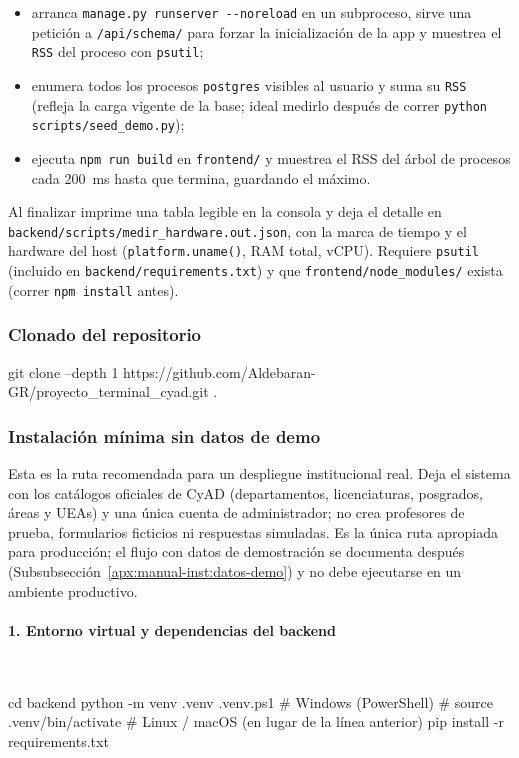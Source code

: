 \begin{itemize}
    \item arranca \texttt{manage.py runserver -{}-noreload} en un subproceso, sirve una petición a \texttt{/api/schema/} para forzar la inicialización de la app y muestrea el \texttt{RSS} del proceso con \texttt{psutil};
    \item enumera todos los procesos \texttt{postgres} visibles al usuario y suma su \texttt{RSS} (refleja la carga vigente de la base; ideal medirlo después de correr \texttt{python scripts/seed\_demo.py});
    \item ejecuta \texttt{npm run build} en \texttt{frontend/} y muestrea el RSS del árbol de procesos cada 200~ms hasta que termina, guardando el máximo.
\end{itemize}

Al finalizar imprime una tabla legible en la consola y deja el detalle en \texttt{backend/scripts/medir\_hardware.out.json}, con la marca de tiempo y el hardware del host (\texttt{platform.uname()}, RAM total, vCPU). Requiere \texttt{psutil} (incluido en \texttt{backend/requirements.txt}) y que \texttt{frontend/node\_modules/} exista (correr \texttt{npm install} antes).

\subsubsection{Clonado del repositorio}

\begin{Comandos}
git clone --depth 1 https://github.com/Aldebaran-GR/proyecto_terminal_cyad.git .
\end{Comandos}

\subsubsection{Instalación mínima sin datos de demo}
\label{apx:manual-inst:install-limpia}

Esta es la ruta recomendada para un despliegue institucional real. Deja el sistema con los catálogos oficiales de CyAD (departamentos, licenciaturas, posgrados, áreas y UEAs) y una única cuenta de administrador; no crea profesores de prueba, formularios ficticios ni respuestas simuladas. Es la única ruta apropiada para producción; el flujo con datos de demostración se documenta después (Subsubsección~\ref{apx:manual-inst:datos-demo}) y no debe ejecutarse en un ambiente productivo.

\paragraph{1. Entorno virtual y dependencias del backend}\mbox{}\\
\begin{Comandos}
cd backend
python -m venv .venv
.venv\Scripts\Activate.ps1    # Windows (PowerShell)
# source .venv/bin/activate   # Linux / macOS (en lugar de la línea anterior)
pip install -r requirements.txt
\end{Comandos}

